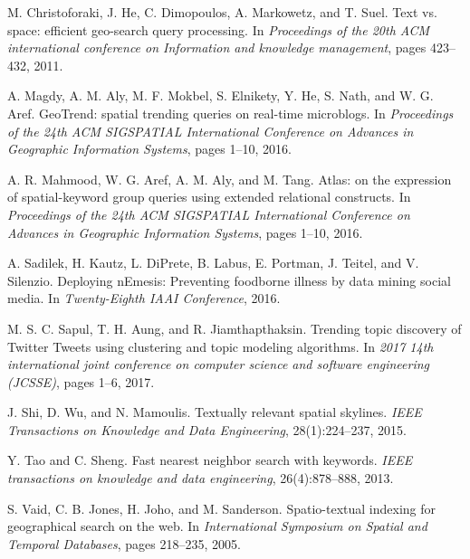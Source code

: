 \documentclass[conference]{IEEEtran}
\begin{document}
\begin{thebibliography}{00}
 M. Christoforaki, J. He, C. Dimopoulos, A. Markowetz, and T. Suel. Text vs. space: efficient geo-search query processing. In \textit{Proceedings of the 20th ACM international conference on Information and knowledge management}, pages 423–432, 2011.

 A. Magdy, A. M. Aly, M. F. Mokbel, S. Elnikety, Y. He, S. Nath, and W. G. Aref. GeoTrend: spatial trending queries on real-time microblogs. In \textit{Proceedings of the 24th ACM SIGSPATIAL International Conference on Advances in Geographic Information Systems}, pages 1–10, 2016.

 A. R. Mahmood, W. G. Aref, A. M. Aly, and M. Tang. Atlas: on the expression of spatial-keyword group queries using extended relational constructs. In \textit{Proceedings of the 24th ACM SIGSPATIAL International Conference on Advances in Geographic Information Systems}, pages 1–10, 2016.

 A. Sadilek, H. Kautz, L. DiPrete, B. Labus, E. Portman, J. Teitel, and V. Silenzio. Deploying nEmesis: Preventing foodborne illness by data mining social media. In \textit{Twenty-Eighth IAAI Conference}, 2016.

 M. S. C. Sapul, T. H. Aung, and R. Jiamthapthaksin. Trending topic discovery of Twitter Tweets using clustering and topic modeling algorithms. In \textit{2017 14th international joint conference on computer science and software engineering (JCSSE)}, pages 1–6, 2017.

 J. Shi, D. Wu, and N. Mamoulis. Textually relevant spatial skylines. \textit{IEEE Transactions on Knowledge and Data Engineering}, 28(1):224–237, 2015.

 Y. Tao and C. Sheng. Fast nearest neighbor search with keywords. \textit{IEEE transactions on knowledge and data engineering}, 26(4):878–888, 2013.

 S. Vaid, C. B. Jones, H. Joho, and M. Sanderson. Spatio-textual indexing for geographical search on the web. In \textit{International Symposium on Spatial and Temporal Databases}, pages 218–235, 2005.

\end{thebibliography}
\vspace{12pt}
\color{red}
\end{document}
